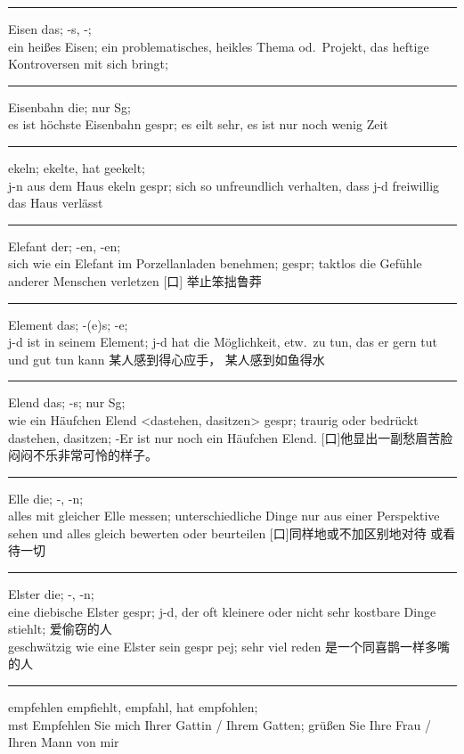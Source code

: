 \noindent\rule{\textwidth}{1pt}
Eisen das; -s, -; \\
ein hei\ss{}es Eisen; ein problematisches, heikles Thema od.\ Projekt, das heftige Kontroversen mit sich bringt; \\
  
\noindent\rule{\textwidth}{1pt}
Eisenbahn die; nur Sg;\\
es ist h\"ochste Eisenbahn gespr; es eilt sehr, es ist nur noch wenig Zeit \\

\noindent\rule{\textwidth}{1pt}
ekeln; ekelte, hat geekelt; \\
j-n aus dem Haus ekeln gespr; sich so unfreundlich verhalten, dass j-d freiwillig das Haus verl\"asst\\
  
\noindent\rule{\textwidth}{1pt}
Elefant der; -en, -en; \\
sich wie ein Elefant im Porzellanladen benehmen; gespr; taktlos die Gef\"uhle anderer Menschen verletzen [口] 举止笨拙鲁莽

\noindent\rule{\textwidth}{1pt}
Element das; -(e)s; -e;\\
j-d ist in seinem Element; j-d hat die M\"oglichkeit, etw.\ zu tun, das er gern tut und gut tun kann
某人感到得心应手， 某人感到如鱼得水

\noindent\rule{\textwidth}{1pt}
Elend das; -s; nur Sg;\\
wie ein H\"aufchen Elend <dastehen, dasitzen> gespr; traurig oder bedr\"uckt dastehen, dasitzen;
-Er ist nur noch ein H\"aufchen Elend. [口]他显出一副愁眉苦脸闷闷不乐非常可怜的样子。\\

\noindent\rule{\textwidth}{1pt}
Elle die; -, -n;\\
alles mit gleicher Elle messen; unterschiedliche Dinge nur aus einer Perspektive sehen und alles gleich bewerten oder beurteilen [口]同样地或不加区别地对待 或看待一切\\

\noindent\rule{\textwidth}{1pt}
Elster die; -, -n;\\
eine diebische Elster gespr; j-d, der oft kleinere oder nicht sehr kostbare Dinge stiehlt; 爱偷窃的人\\
geschw\"atzig wie eine Elster sein gespr pej; sehr viel reden 是一个同喜鹊一样多嘴的人\\

\noindent\rule{\textwidth}{1pt}
empfehlen empfiehlt, empfahl, hat empfohlen;\\
mst Empfehlen Sie mich Ihrer Gattin / Ihrem Gatten; gr\"u\ss{}en Sie Ihre Frau / Ihren Mann von mir \\

